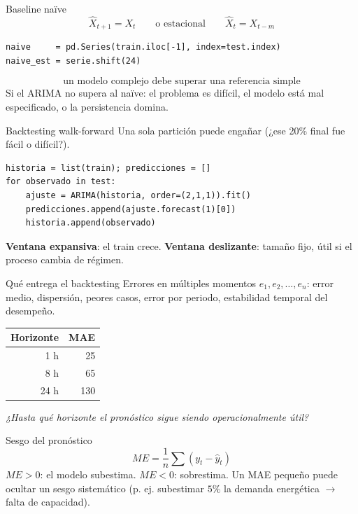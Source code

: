 \begin{frame}[fragile]{Baseline naïve}
\[
\hat X_{t+1}=X_t
\qquad\text{o estacional}\qquad
\hat X_t=X_{t-m}
\]
\begin{lstlisting}
naive     = pd.Series(train.iloc[-1], index=test.index)
naive_est = serie.shift(24)
\end{lstlisting}
\[
\boxed{\text{un modelo complejo debe superar una referencia simple}}
\]
Si el ARIMA no supera al naïve: el problema es difícil, el modelo está mal
especificado, o la persistencia domina.
\end{frame}

\begin{frame}[fragile]{Backtesting walk-forward}
Una sola partición puede engañar (¿ese 20\% final fue fácil o difícil?).
\begin{lstlisting}
historia = list(train); predicciones = []
for observado in test:
    ajuste = ARIMA(historia, order=(2,1,1)).fit()
    predicciones.append(ajuste.forecast(1)[0])
    historia.append(observado)
\end{lstlisting}
\textbf{Ventana expansiva}: el train crece. \textbf{Ventana deslizante}: tamaño fijo,
útil si el proceso cambia de régimen.
\end{frame}

\begin{frame}{Qué entrega el backtesting}
Errores en múltiples momentos $e_1,e_2,\dots,e_n$: error medio, dispersión, peores casos,
error por periodo, estabilidad temporal del desempeño.
\vfill
\begin{center}
\begin{tabular}{rr}
\toprule
Horizonte & MAE\\
\midrule
1 h & 25\\
8 h & 65\\
24 h & 130\\
\bottomrule
\end{tabular}
\end{center}
\emph{¿Hasta qué horizonte el pronóstico sigue siendo operacionalmente útil?}
\end{frame}

\begin{frame}{Sesgo del pronóstico}
\[
ME=\frac{1}{n}\sum (y_t-\hat y_t)
\]
$ME>0$: el modelo subestima. $ME<0$: sobrestima. Un MAE pequeño puede ocultar un
sesgo sistemático (p. ej. subestimar $5\%$ la demanda energética $\to$ falta de capacidad).
\end{frame}

